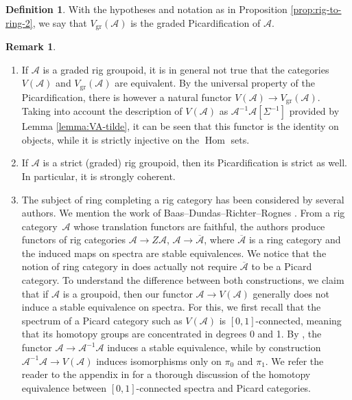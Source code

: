 \documentclass[JEP,XML,SOM,Unicode,published]{cedram}
\theoremstyle{plain}
\theoremstyle{definition}
\newtheorem{definition}[theorem]{Definition}
\newtheorem{remark}[theorem]{Remark}
\newcommand{\Acal}{\mathcal A}
\DeclareMathOperator{\Hom}{Hom}
\let\ov\overline
\begin{document}
\begin{definition}\label{def:gr-picardification}
With the hypotheses and notation as in Proposition \ref{prop:rig-to-ring-2}, we say that $V_{\mathrm{gr}}(\Acal)$ is the graded Picardification of $\Acal$.
\end{definition}

\skpt
\begin{remark}\label{rem:picardification}
\begin{enumerate}
\item\label{item:rem-picardification-1} If $\Acal$ is a graded rig groupoid, it is in general not true that the categories $V(\Acal)$ and $V_{\mathrm{gr}}(\Acal)$ are equivalent. By the universal property of the Picardification, there is however a natural functor $V(\Acal)\to V_{\mathrm{gr}}(\Acal)$. Taking into account the description of $V(\Acal)$ as $\Acal^{-1}\Acal[\Sigma^{-1}]$ provided by Lemma \ref{lemma:VA-tilde}, it can be seen that this functor is the identity on objects, while it is strictly injective on the $\Hom$ sets.
\item If $\Acal$ is a strict (graded) rig groupoid, then its Picardification is strict as well. In particular, it is strongly coherent.
\item\label{rem:picardification-3} The subject of ring completing a rig category has been considered by several authors. We mention the work of Baas--Dundas--Richter--Rognes \cite{BDRR}. From a rig \hbox{category}~$\Acal$ whose translation functors are faithful, the authors produce functors of rig categories $\Acal\to Z\Acal$, $\Acal\to\ov{\Acal}$, where $\ov{\Acal}$ is a ring category and the induced maps on spectra are stable equivalences. We notice that the notion of ring category in \cite{BDRR} does actually not require $\ov{\Acal}$ to be a Picard category. To understand the difference between both constructions, we claim that if $\Acal$ is a groupoid, then our functor $\Acal\to V(\Acal)$ generally does not induce a stable equivalence on spectra. For this, we first recall that the spectrum of a Picard category such as $V(\Acal)$ is $[0,1]$-connected, meaning that its homotopy groups are concentrated in degrees 0 and 1. By \cite[pp.\,1657--1658]{ThomasonSpectral}, the functor $\Acal\to\Acal^{-1}\Acal$ induces a stable equivalence, while by construction $\Acal^{-1}\Acal\to V(\Acal)$ induces isomorphisms only on $\pi_{0}$ and $\pi_{1}$. We refer the reader to the appendix in \cite{Patel} for a thorough discussion of the homotopy equivalence between $[0,1]$-connected spectra and Picard categories.
\end{enumerate}
\end{remark}
\end{document}
